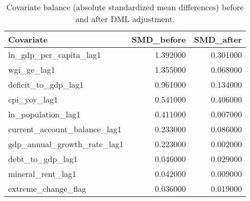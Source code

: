 \begin{table}
\caption{Covariate balance (absolute standardized mean differences) before and after DML adjustment.}
\label{tab:balance}
\begin{tabular}{lrr}
\toprule
Covariate & SMD_before & SMD_after \\
\midrule
ln_gdp_per_capita_lag1 & 1.392000 & 0.301000 \\
wgi_ge_lag1 & 1.355000 & 0.068000 \\
deficit_to_gdp_lag1 & 0.961000 & 0.134000 \\
cpi_yoy_lag1 & 0.541000 & 0.406000 \\
ln_population_lag1 & 0.411000 & 0.007000 \\
current_account_balance_lag1 & 0.233000 & 0.086000 \\
gdp_annual_growth_rate_lag1 & 0.223000 & 0.002000 \\
debt_to_gdp_lag1 & 0.046000 & 0.029000 \\
mineral_rent_lag1 & 0.042000 & 0.009000 \\
extreme_change_flag & 0.036000 & 0.019000 \\
\bottomrule
\end{tabular}
\end{table}
